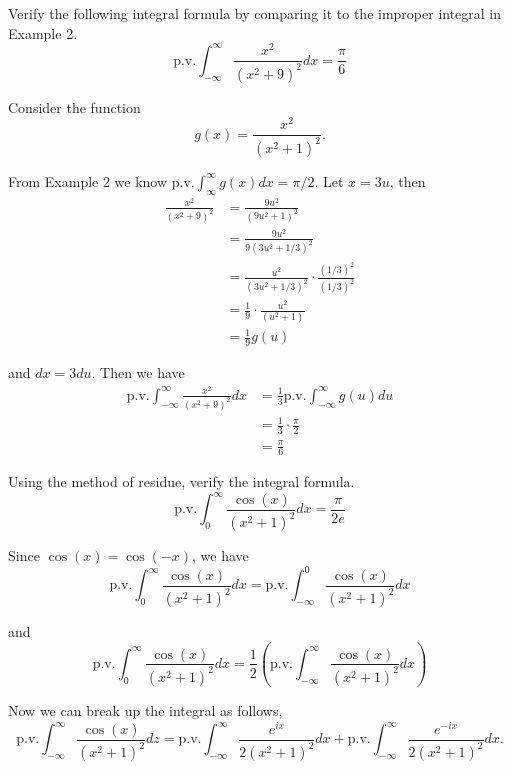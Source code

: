 \documentclass[12pt]{article}
\author{Warren Atkison}
\date{\today}
\newenvironment{exercise}[2][Exercise]{\begin{trivlist}
\item[\hskip \labelsep {\bfseries #1} \hskip \labelsep {\bfseries #2.}]}{\end{trivlist}}
\begin{document}
\fancyhf{}
\fancyhead[R]{\today}
\fancyfoot[R]{\thepage}

\begin{exercise}{6.3.2}
	Verify the following integral formula by comparing it to the improper integral in Example 2.
	\[
		\text{p.v.} \int_{-\infty}^{\infty} \frac{x^2}{(x^2 + 9)^2}dx = \frac{\pi}{6}
	\]
\end{exercise}

Consider the function
\[
	g(x) = \frac{x^2}{(x^2 + 1)^2}.
\]

From Example 2 we know p.v.$\int_{\infty}^{\infty} g(x)dx = \pi/2$. Let $x = 3u$, then
\begin{align*}
	\frac{x^2}{(x^2 + 9)^2} &= \frac{9u^2}{(9u^2 + 1)^2} \\
				&= \frac{9u^2}{9(3u^2 + 1/3)^2} \\
				&= \frac{u^2}{(3u^2 + 1/3)^2} \cdot \frac{(1/3)^2}{(1/3)^2} \\
				&= \frac{1}{9}\cdot \frac{u^2}{(u^2 + 1)} \\
				&= \frac{1}{9}g(u)
\end{align*}

and $dx = 3du$. Then we have
\begin{align*}
	\text{p.v.}\int_{-\infty}^{\infty} \frac{x^2}{(x^2 + 9)^2}dx &= \frac{1}{3}\text{p.v.} \int_{-\infty}^{\infty} g(u)du \\
								     &= \frac{1}{3}\cdot\frac{\pi}{2} \\
								     &= \frac{\pi}{6}
\end{align*}

\begin{exercise}{6.4.3}
	Using the method of residue, verify the integral formula.
	\[
		\text{p.v.}\int_{0}^{\infty} \frac{\cos(x)}{(x^2 + 1)^2}dx = \frac{\pi}{2e}
	\]
\end{exercise}

Since $\cos(x) = \cos(-x)$, we have
\[
	\text{p.v.}\int_{0}^{\infty} \frac{\cos(x)}{(x^2 + 1)^2}dx = \text{p.v.}\int_{-\infty}^{0} \frac{\cos(x)}{(x^2 + 1)^2}dx
\]

and
\[
	\text{p.v.}\int_{0}^{\infty} \frac{\cos(x)}{(x^2 + 1)^2}dx = \frac{1}{2}\left(\text{p.v.}\int_{-\infty}^{\infty} \frac{\cos(x)}{(x^2 + 1)^2}dx	\right)
\]

Now we can break up the integral as follows,
\[
	\text{p.v.}\int_{-\infty}^{\infty} \frac{\cos(x)}{(x^2 + 1)^2}dz = \text{p.v.}\int_{-\infty}^{\infty} \frac{e^{ix}}{2(x^2 + 1)^2}dx + \text{p.v.}\int_{-\infty}^{\infty} \frac{e^{-ix}}{2(x^2 + 1)^2}dx.
\]
\end{document}

